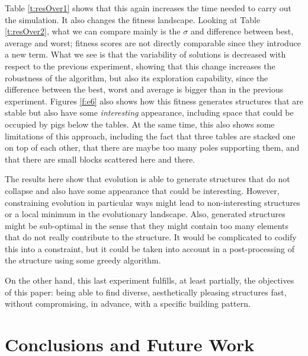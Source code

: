 \documentclass[a4paper,twoside]{article}
\begin{document}
Table \ref{t:resOver1} shows that this again
increases the time needed to carry out the simulation. It also changes
the fitness landscape. Looking at Table \ref{t:resOver2}, what we
can compare mainly is the $\sigma$ and difference between best,
average and worst; fitness scores are not directly comparable since
they introduce a new term. What we see is that the variability of
solutions is decreased with respect to the previous experiment,
showing that this change increases the robustness of the algorithm,
but also its exploration capability, since the difference between the
best, worst and average is bigger than in the previous
experiment. Figures \ref{f:e6}  also
shows how this fitness generates structures that are stable but also
have some {\em interesting} appearance, including space that could be
occupied by pigs below the tables. At the same time, this also shows
some limitations of this approach, including the fact that three
tables are stacked one on top of each other, that there are maybe too
many poles supporting them, and that there are small blocks scattered
here and there.

The results here show that evolution is able to generate structures
that do not collapse and also have some appearance that could be
interesting. However, constraining evolution in particular ways might
lead to non-interesting structures or a local minimum in the
evolutionary landscape. Also, generated structures might be
sub-optimal in the sense that they might contain too many elements
that do not really contribute to the structure. It would be
complicated to codify this into a constraint, but it could be taken
into account in a post-processing of the structure using some greedy
algorithm.

On the other hand, this last experiment fulfills, at least partially,
the objectives of this paper: being able to find diverse,
aesthetically pleasing structures fast, without compromising, in
advance, with a specific building pattern.


%
\section{Conclusions and Future Work} 
\label{sec:conclusions}
\end{document}
